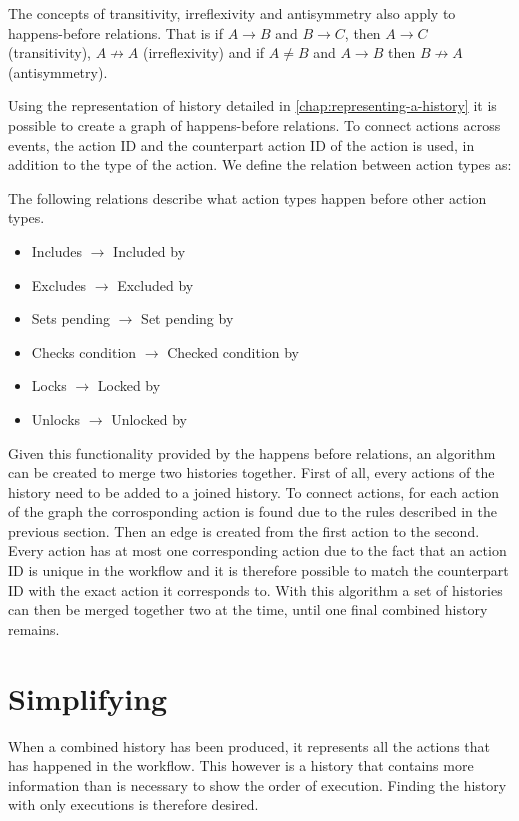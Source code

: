	The concepts of transitivity, irreflexivity and antisymmetry also apply to happens-before relations. That is if $A \rightarrow B$ and $B \rightarrow C$, then $A \rightarrow C$ (transitivity), $A \not\rightarrow A$ (irreflexivity) and if $A \neq B$ and $A \rightarrow B$ then $B \not\rightarrow A$ (antisymmetry).
	
	\newpar Using the representation of history detailed in \autoref{chap:representing-a-history} it is possible to create a graph of happens-before relations. To connect actions across events, the action ID and the counterpart action ID of the action is used, in addition to the type of the action. We define the relation between action types as:
	
	\begin{definition}
		The following relations describe what action types happen before other action types.
			\begin{itemize}
				\item Includes $\rightarrow$ Included by
				\item Excludes $\rightarrow$ Excluded by
				\item Sets pending $\rightarrow$ Set pending by
				\item Checks condition $\rightarrow$ Checked condition by
				\item Locks $\rightarrow$ Locked by
				\item Unlocks $\rightarrow$ Unlocked by
			\end{itemize}
	\end{definition}
	
	Given this functionality provided by the happens before relations, an algorithm can be created to merge two histories together. First of all, every actions of the history need to be added to a joined history. To connect actions, for each action of the graph the corrosponding action is found due to the rules described in the previous section. Then an edge is created from the first action to the second. Every action has at most one corresponding action due to the fact that an action ID is unique in the workflow and it is therefore possible to match the counterpart ID with the exact action it corresponds to. With this algorithm a set of histories can then be merged together two at the time, until one final combined history remains.
	
	\section{Simplifying}
	When a combined history has been produced, it represents all the actions that has happened in the workflow. This however is a history that contains more information than is necessary to show the order of execution. Finding the history with only executions is therefore desired.
	
